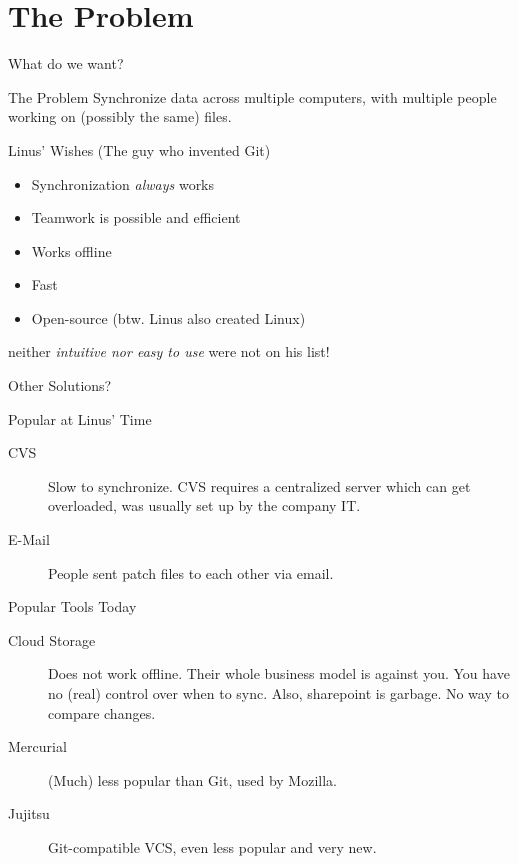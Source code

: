 \documentclass[xetex]{beamer}
\begin{document}
\section{The Problem}

\begin{frame}{What do we want?}
  \begin{alertblock}{The Problem}
    Synchronize data across multiple computers, with multiple people working on
    (possibly the same) files.
  \end{alertblock}
  \pause

  \begin{block}{Linus' Wishes (The guy who invented Git)}
    \begin{itemize}
      \item Synchronization \emph{always} works
      \item Teamwork is possible and efficient
      \item Works offline
      \item Fast
      \item Open-source (btw. Linus also created Linux)
    \end{itemize}
    neither \emph{intuitive nor easy to use} were not on his list!
  \end{block}
\end{frame}

\begin{frame}{Other Solutions?}
  \begin{block}{Popular at Linus' Time}
    \begin{description}
      \item[CVS] Slow to synchronize. CVS requires a centralized server which
        can get overloaded, was usually set up by the company IT.
      \item[E-Mail] People sent patch files to each other via email.
    \end{description}
  \end{block}
  \begin{block}{Popular Tools Today}
    \begin{description}
      \item[Cloud Storage] Does not work offline. Their whole business model is
        against you. You have no (real) control over when to sync. Also,
        sharepoint is garbage. No way to compare changes.

      \item[Mercurial] (Much) less popular than Git, used by Mozilla.

      \item[Jujitsu] Git-compatible VCS, even less popular and very new.
    \end{description}
  \end{block}
\end{frame}
\end{document}

